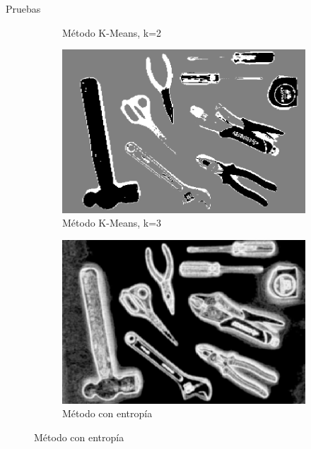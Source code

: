 \documentclass[
  24pt, %
]{beamer}
\begin{document}
\begin{frame}{Pruebas}
\begin{figure}[h]
\begin{subfigure}{0.4\linewidth}
    \caption{Método K-Means, k=2}
  \end{subfigure}
  \begin{subfigure}{0.4\linewidth}
    \includegraphics[width=\linewidth]{kmeans3}
    \caption{Método K-Means, k=3}
  \end{subfigure}
  \begin{subfigure}{0.4\linewidth}
    \includegraphics[width=\linewidth]{entropia}
    \caption{Método con entropía}
  \end{subfigure}
  \label{fig:1}
\end{figure}
\end{frame}
\end{document}
